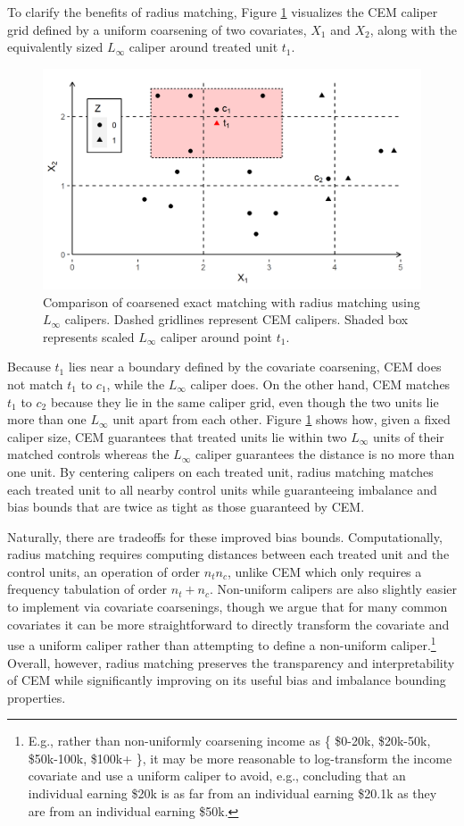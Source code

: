 \documentclass{article}
\begin{document}
To clarify the benefits of radius matching, Figure \ref{fig:vs_cem} visualizes the CEM caliper grid defined by a uniform coarsening of two covariates, $X_1$ and $X_2$,
along with the equivalently sized $L_\infty$ caliper around treated unit $t_1$.
\begin{figure}
    \centering
    \includegraphics[width=\textwidth]{writeup/figures/show_cem_calipers.png}
    \caption{Comparison of coarsened exact matching with radius matching using $L_\infty$ calipers.
    Dashed gridlines represent CEM calipers.
    Shaded box represents scaled $L_\infty$ caliper around point $t_1$.}
    \label{fig:vs_cem}
\end{figure}
Because $t_1$ lies near a boundary defined by the covariate coarsening, CEM does not match $t_1$ to $c_1$, while the $L_\infty$ caliper does.
On the other hand, CEM matches $t_1$ to $c_2$ because they lie in the same caliper grid, even though the two units lie more than one $L_\infty$ unit apart from each other.
Figure \ref{fig:vs_cem} shows how, given a fixed caliper size, CEM guarantees that treated units lie within two $L_\infty$ units of their matched controls whereas the $L_\infty$ caliper guarantees the distance is no more than one unit.
By centering calipers on each treated unit, radius matching matches each treated unit to all nearby control units while guaranteeing imbalance and bias bounds that are twice as tight as those guaranteed by CEM.

Naturally, there are tradeoffs for these improved bias bounds.
Computationally, radius matching requires computing distances between each treated unit and the control units, an operation of order $n_t n_c$, unlike CEM which only requires a frequency tabulation of order $n_t+n_c$.
Non-uniform calipers are also slightly easier to implement via covariate coarsenings, though we argue that for many common covariates it can be more straightforward to directly transform the covariate and use a uniform caliper rather than attempting to define a non-uniform caliper.\footnote{E.g., rather than non-uniformly coarsening income as \{ \$0-20k, \$20k-50k, \$50k-100k, \$100k+ \}, it may be more reasonable to log-transform the income covariate and use a uniform caliper to avoid, e.g., concluding that an individual earning \$20k is as far from an individual earning \$20.1k as they are from an individual earning \$50k.}
Overall, however, radius matching preserves the transparency and interpretability of CEM while significantly improving on its useful bias and imbalance bounding properties.
\end{document}
